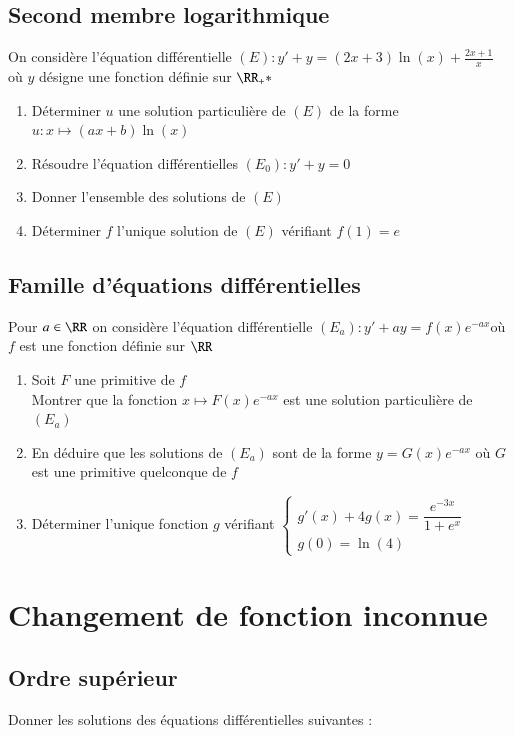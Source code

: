 \documentclass[oneside,12pt]{article}          %
\begin{document}
\subsection{Second membre logarithmique}
On considère l'équation différentielle $(E):y'+y=(2x+3)\ln(x)+\frac{2x+1}{x}$ \quad où $y$ désigne une fonction définie sur $\RR_+*$

\begin{enumerate}
    \item Déterminer $u$ une solution particulière de $(E)$ de la forme $u:x\mapsto(ax+b)\ln(x)$
    \item Résoudre l'équation différentielles $(E_0):y'+y=0$
    \item Donner l'ensemble des solutions de $(E)$
    \item Déterminer $f$ l'unique solution de $(E)$ vérifiant $f(1)=e$
\end{enumerate}



\subsection{Famille d'équations différentielles}
Pour $a\in\RR$ on considère l'équation différentielle $(E_a):y'+ay=f(x)e^{-ax}$\quad où $f$ est une fonction définie sur $\RR$
\begin{enumerate}
	\item Soit $F$ une primitive de $f$\\
	Montrer que la fonction $x\mapsto F(x)e^{-ax}$ est une solution particulière de $(E_a)$
	\item En déduire que les solutions de $(E_a)$ sont de la forme $y=G(x)e^{-ax}$ où $G$ est une primitive quelconque de $f$
	\item Déterminer l'unique fonction $g$ vérifiant $\begin{cases}g'(x)+4g(x)=\dfrac{e^{-3x}}{1+e^x}\\g(0)=\ln(4)\end{cases}$
\end{enumerate}




\section{Changement de fonction inconnue}

\subsection{Ordre supérieur}
Donner les solutions des équations différentielles suivantes :
\end{document}
